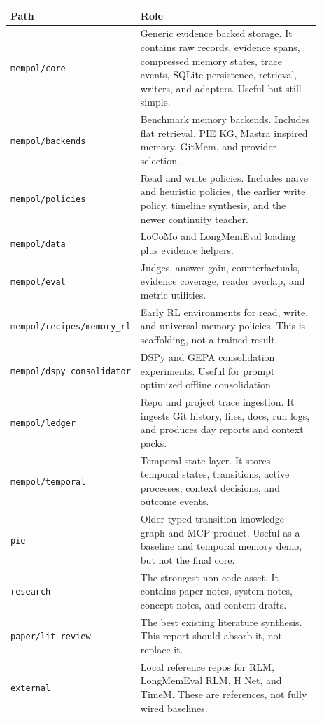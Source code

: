\documentclass[11pt]{article}
\begin{document}
\begin{longtable}{p{0.28\linewidth} p{0.60\linewidth}}
\toprule
Path & Role \\
\midrule
\texttt{mempol/core} & Generic evidence backed storage. It contains raw records, evidence spans, compressed memory states, trace events, SQLite persistence, retrieval, writers, and adapters. Useful but still simple. \\
\texttt{mempol/backends} & Benchmark memory backends. Includes flat retrieval, PIE KG, Mastra inspired memory, GitMem, and provider selection. \\
\texttt{mempol/policies} & Read and write policies. Includes naive and heuristic policies, the earlier write policy, timeline synthesis, and the newer continuity teacher. \\
\texttt{mempol/data} & LoCoMo and LongMemEval loading plus evidence helpers. \\
\texttt{mempol/eval} & Judges, answer gain, counterfactuals, evidence coverage, reader overlap, and metric utilities. \\
\texttt{mempol/recipes/memory\_rl} & Early RL environments for read, write, and universal memory policies. This is scaffolding, not a trained result. \\
\texttt{mempol/dspy\_consolidator} & DSPy and GEPA consolidation experiments. Useful for prompt optimized offline consolidation. \\
\texttt{mempol/ledger} & Repo and project trace ingestion. It ingests Git history, files, docs, run logs, and produces day reports and context packs. \\
\texttt{mempol/temporal} & Temporal state layer. It stores temporal states, transitions, active processes, context decisions, and outcome events. \\
\texttt{pie} & Older typed transition knowledge graph and MCP product. Useful as a baseline and temporal memory demo, but not the final core. \\
\texttt{research} & The strongest non code asset. It contains paper notes, system notes, concept notes, and content drafts. \\
\texttt{paper/lit-review} & The best existing literature synthesis. This report should absorb it, not replace it. \\
\texttt{external} & Local reference repos for RLM, LongMemEval RLM, H Net, and TimeM. These are references, not fully wired baselines. \\
\bottomrule
\end{longtable}
\end{document}
